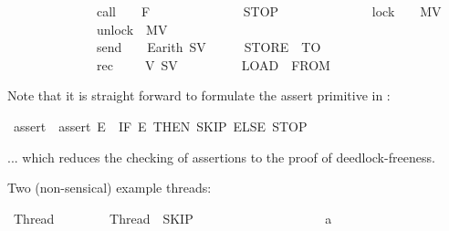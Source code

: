 \begin{isabellebody}
\ \ \ \ \ \ \ \ \ \ \ \ \ {\isacharbar}{\kern0pt}\ call\ \ \ \ F\isanewline
\isanewline
\ \ \ \ \ \ \ \ \ \ \ \ \ {\isacharbar}{\kern0pt}\ STOP\isanewline
\ \ \ \ \ \ \ \ \ \ \ \ \ {\isacharbar}{\kern0pt}\ lock\ \ \ \ MV\isanewline
\ \ \ \ \ \ \ \ \ \ \ \ \ {\isacharbar}{\kern0pt}\ unlock\ \ MV\ \ \ \ \ \ \ \ \ \ \ \ \isanewline
\ \ \ \ \ \ \ \ \ \ \ \ \ {\isacharbar}{\kern0pt}\ send\ \ \ \ E\isactrlsub a\isactrlsub r\isactrlsub i\isactrlsub t\isactrlsub h\ SV\ \ \ \ \ \ {\isacharparenleft}{\kern0pt}{\isachardoublequoteopen}STORE\ {\isacharunderscore}{\kern0pt}\ TO\ \ {\isacharunderscore}{\kern0pt}{\isachardoublequoteclose}\ {\isacharbrackleft}{\kern0pt}{}{}{\isacharcomma}{\kern0pt}{}{}{\isacharbrackright}{\kern0pt}{}{}{\isacharparenright}{\kern0pt}\ \ \ \ \ \ \ \ \ \ \ \ \ \ \isanewline
\ \ \ \ \ \ \ \ \ \ \ \ \ {\isacharbar}{\kern0pt}\ rec\ \ \ \ \ V\ SV\ \ \ \ \ \ \ \ \ \ {\isacharparenleft}{\kern0pt}{\isachardoublequoteopen}LOAD\ {\isacharunderscore}{\kern0pt}\ FROM\ {\isacharunderscore}{\kern0pt}{\isachardoublequoteclose}\ {\isacharbrackleft}{\kern0pt}{}{}{\isacharcomma}{\kern0pt}{}{}{\isacharbrackright}{\kern0pt}{}{}{\isacharparenright}{\kern0pt}%
\begin{isamarkuptext}%
Note that it is straight forward to formulate the assert primitive in :%
\end{isamarkuptext}\isamarkuptrue%
\isamarkupfalse%
\ assert\ \ {\isacartoucheopen}assert\ E\ {\isasymequiv}\ IF\ E\ THEN\ SKIP\ ELSE\ STOP\ {\isacartoucheclose}%
\begin{isamarkuptext}%
... which reduces the checking of assertions to the proof of deedlock-freeness.%
\end{isamarkuptext}\isamarkuptrue%
%
\begin{isamarkuptext}%
Two (non-sensical) example threads:%
\end{isamarkuptext}\isamarkuptrue%
\isamarkupfalse%
\ Thread{}\ \isanewline
\ \ \ \ \ \ {\isacartoucheopen}\ Thread{}\ {\isasymequiv}\ SKIP\ {\isacharsemicolon}{\kern0pt}\ \isanewline
\ \ \ \ \ \ \ \ \ \ \ \ \ \ \ \ \ \ {\isacharprime}{\kern0pt}{\isacharprime}{\kern0pt}a{\isacharprime}{\kern0pt}{\isacharprime}{\kern0pt}\ {\isacharcolon}{\kern0pt}{\isacharequal}{\kern0pt}\ \ {\isacharparenleft}{\kern0pt}{\isasymlambda}{\isasymsigma}{\isachardot}{\kern0pt}\ {}\ {\isacharplus}{\kern0pt}\ {}{\isacharparenright}{\kern0pt}{\isacharsemicolon}{\kern0pt}\ \isanewline

\end{isabellebody}
